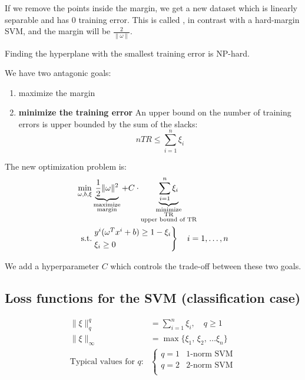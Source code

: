 If we remove the points inside the margin, we get a new dataset
which is linearly separable and has 0 training error. This is called
, in contrast with a hard-margin SVM, and
the margin will be $\frac{2}{\|\omega\|}$.

Finding the hyperplane with the smallest training error
is NP-hard.

We  have two antagonic goals:
\begin{enumerate}
	\item maximize the margin
	\item \textbf{minimize the training error} An upper bound on the
	      number of training errors is upper bounded by the sum of the slacks:
	      \begin{equation*}
		      n TR \leq \sum_{i=1}^n \xi_i
	      \end{equation*}
\end{enumerate}

The new optimization problem is:
\begin{align*}
	\min_{\omega, b, \xi} &
	\underbrace{\frac{1}{2} \|\omega\|^2}_{\substack{\text{maximize}     \\\text{margin}}}
	+ C \cdot \underbrace{\sum_{i=1}^n \xi_i}_{\substack{\text{minimize} \\\text{TR}\\\text{upper bound of TR}}} \\
	\text{s.t.}           & \begin{rcases*}
		                        y^i (\omega^T x^i + b) \geq 1 - \xi_i \\
		                        \xi_i \geq 0
	                        \end{rcases*}
	\quad i=1,\dots,n
\end{align*}

We add a hyperparameter $C$ which controls the trade-off between
these two goals.

\subsection{Loss functions for the SVM (classification case)}

\begin{align*}
	\lVert \xi \rVert_q^q          & = \sum_{i=1}^n \xi_i,\quad q \geq 1      \\
	\lVert \xi \rVert_\infty       & = \max \{ \xi_1,\,\xi_2,\,\dots \xi_n \} \\
	\text{Typical values for $q$:} & \begin{cases*}
		                                 q=1 & \text{1-norm SVM} \\
		                                 q=2 & \text{2-norm SVM} \\
	                                 \end{cases*}
\end{align*}

